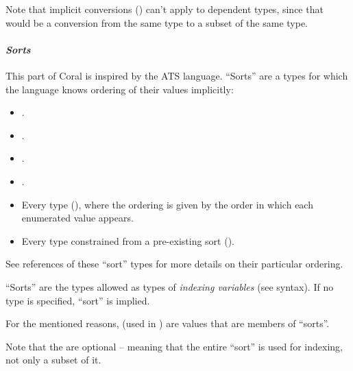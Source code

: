 Note that implicit conversions () can't apply to dependent types, since that would be a conversion from the same type to a subset of the same type. 

\paragraph{\em Sorts}
This part of Coral is inspired by the ATS language. ``Sorts'' are a types for which the language knows ordering of their values implicitly:
\begin{itemize}
\item {}.
\item {}.
\item {}.
\item {}.
\item Every  type (), where the ordering is given by the order in which each enumerated value appears. 
\item Every type constrained from a pre-existing sort ().
\end{itemize}

See references of these ``sort'' types for more details on their particular ordering. 

``Sorts'' are the types allowed as types of {\em indexing variables} (see  syntax). If no type is specified,  ``sort'' is implied. 

For the mentioned reasons,  (used in ) are values that are members of ``sorts''. 

Note that the  are optional -- meaning that the entire ``sort'' is used for indexing, not only a subset of it. 

